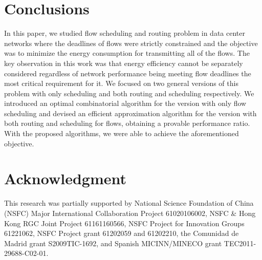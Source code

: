 \documentclass[10pt, conference, compsocconf]{IEEEtran}
\begin{document}
\section{Conclusions}
\label{sec:conc}

In this paper, we studied flow scheduling and routing problem in data center networks where the deadlines of flows were strictly constrained and the objective was to minimize the energy consumption for transmitting all of the flows. The key observation in this work was that energy efficiency cannot be separately considered regardless of network performance being meeting flow deadlines the most critical requirement for it. We focused on two general versions of this problem with only scheduling and both routing and scheduling respectively. We introduced an optimal combinatorial algorithm for the version with only flow scheduling and devised an efficient approximation algorithm for the version with both routing and scheduling for flows, obtaining a provable performance ratio. With the proposed algorithms, we were able to achieve the aforementioned objective.







\section*{Acknowledgment}

This research was partially supported by National Science Foundation of China (NSFC) Major International Collaboration Project 61020106002, NSFC \& Hong Kong RGC Joint Project 61161160566, NSFC Project for Innovation Groups 61221062, NSFC Project grant 61202059 and 61202210, the Comunidad de Madrid grant S2009TIC-1692, and Spanish MICINN/MINECO grant TEC2011-29688-C02-01. 














\balance
\end{document}
